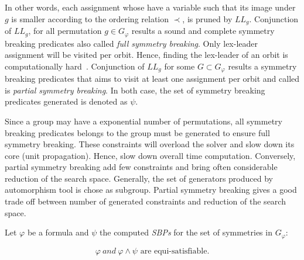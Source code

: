 In other words, each assignment whose have a variable such that its image under $g$ is smaller according to the ordering relation $\prec$, is pruned by $LL_g$.
Conjunction of $LL_g$, for all permutation  $g \in G_{\varphi} $ results a sound and complete symmetry breaking predicates also called \emph{full symmetry breaking}. Only lex-leader assignment will be visited 
per orbit. Hence, finding the lex-leader of an orbit is computationally hard~\cite{Luks2004}. 
Conjunction of $LL_g$ for some $G \subset G_{\varphi}$ results a symmetry breaking predicates that aims to
visit at least one assignment per orbit and called is \emph{partial symmetry breaking}.
In both case, the set of symmetry breaking predicates generated is denoted as $\psi$.

Since  a group may have a exponential number of permutations, all symmetry breaking predicates belongs
to the group must be generated to ensure full symmetry breaking. These constraints will overload the 
solver and slow down its core (unit propagation). Hence, slow down overall time computation.
Conversely, partial symmetry breaking add few constraints and bring often considerable reduction of the
search space. Generally, the set of generators produced by automorphism tool is chose as subgroup.
Partial symmetry breaking gives a good trade off between number of generated constraints and reduction of the search space.


%
%




\begin{theorem}
	\label{theorem:satisfiability_preservation_SBPs}
	Let $\varphi$ be a formula and $\psi$ the computed \textit{SBPs} for the set of	symmetries in $G_{\varphi}$:
	
	$$\varphi~and ~\varphi \wedge \psi \text{ are equi-satisfiable}.$$
\end{theorem}

